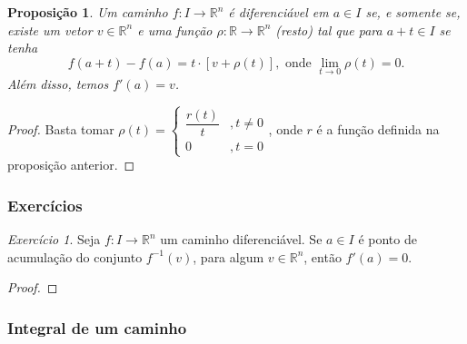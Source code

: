 \documentclass{article}
\newtheorem{prop}{Proposição}[section]
\theoremstyle{theorem}
\theoremstyle{lemma}
\theoremstyle{definition}
\theoremstyle{remark}
\newtheorem{exercicio}{Exercício}[subsection]
\begin{document}
   \begin{prop}
	   Um caminho \( f:I\to \mathbb{R}^n \) é diferenciável em \(a\in I\) se, e somente se, existe um vetor \(v\in \mathbb{R}^n\) e uma função $\rho : \mathbb{R} \to \mathbb{R}^n$ (resto) tal que para \(a+t\in I\) se tenha \[ f(a+t) - f(a) = t\cdot\left[ v + \rho(t)\right], \text{ onde } \lim_{t \to 0} \rho(t) = 0.\]
	   Além disso, temos \(f'(a) = v\).
   \end{prop}
   \begin{proof}
	   Basta tomar \(\rho(t) = \begin{cases} \dfrac{r(t)}{t} &, t\neq 0 \\ 0 &, t=0 \end{cases} \), onde $r$ é a função definida  na proposição anterior.
   \end{proof}
   \subsubsection{Exercícios}
   \begin{exercicio}
	   Seja \(f:I\to \mathbb{R}^n\) um caminho diferenciável. Se \(a\in I\) é ponto de acumulação do conjunto \(f^{-1}(v)\), para algum \(v\in \mathbb{R}^n\), então $f'(a) = 0$.
   \end{exercicio}
   \begin{proof}

   \end{proof}
	   
   \subsubsection{ Integral de um caminho}
\end{document}
